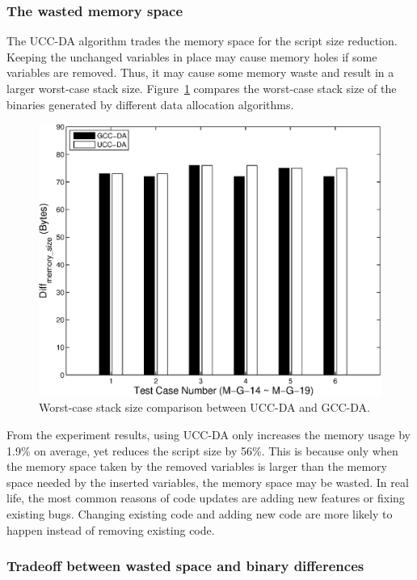 \subsubsection{The wasted memory space}

The UCC-DA algorithm trades the memory space for the script size reduction. Keeping
the unchanged variables in place may cause memory holes if some variables are removed.
Thus, it may cause some memory waste and result in a larger worst-case stack size.
Figure~\ref{da-stack} compares the worst-case stack size of the binaries generated
by different data allocation algorithms.

\begin{figure}[htbp]
\centering
\includegraphics[scale=0.6]{./figures/stacksize.eps}
\caption{Worst-case stack size comparison between UCC-DA and GCC-DA.}
\label{da-stack}
\vspace{-0.1in}
\end{figure}

From the experiment results, using UCC-DA only increases the memory usage by 1.9\% on average,
yet reduces the script size by 56\%.
This is because only when the memory space taken by the removed variables is larger than
the memory space needed by the inserted variables, the memory space may be wasted.
In real life, the most common reasons of code updates are adding new features or fixing existing bugs.
Changing existing code and adding new code are more likely to happen instead of removing 
existing code.

\subsubsection{Tradeoff between wasted space and binary differences }

